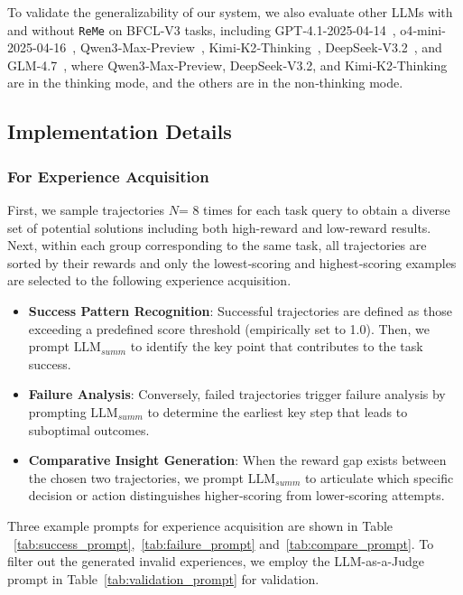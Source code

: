 \documentclass[11pt]{article}
\newcommand{\ours}{\texttt{ReMe}}
\begin{document}
To validate the generalizability of our system, we also evaluate other LLMs with and without {\ours} on BFCL-V3 tasks, including GPT‑4.1-2025-04-14~\cite{gpt-4.1}, o4‑mini-2025-04-16~\cite{o4-mini}, Qwen3‑Max-Preview~\cite{qwen3max}, Kimi‑K2‑Thinking~\cite{kimi-k2-thinking}, DeepSeek‑V3.2~\cite{liu2025deepseek}, and GLM‑4.7~\cite{glm-4.7}, where Qwen3‑Max‑Preview, DeepSeek‑V3.2, and Kimi‑K2‑Thinking are in the thinking mode, and the others are in the non‑thinking mode.

\subsection{Implementation Details}
\subsubsection{For Experience Acquisition}\label{app:settings}
First, we sample trajectories $N$= 8 times for each task query to obtain a diverse set of potential solutions including both high-reward and low-reward results. 
Next, within each group corresponding to the same task, all trajectories are sorted by their rewards and only the lowest‑scoring and highest‑scoring examples are selected to the following experience acquisition. 

\begin{itemize}[leftmargin=12pt,topsep=2pt,itemsep=-2pt]
    \item \textbf{Success Pattern Recognition}: Successful trajectories are defined as those exceeding a predefined score threshold (empirically set to 1.0). Then, we prompt $\text{LLM}_{summ}$ to identify the key point that contributes to the task success. 
    \item \textbf{Failure Analysis}: Conversely, failed trajectories trigger failure analysis by prompting $\text{LLM}_{summ}$ to determine the earliest key step that leads to suboptimal outcomes.
    \item \textbf{Comparative Insight Generation}: When the reward gap exists between the chosen two trajectories, we prompt $\text{LLM}_{summ}$ to articulate which specific decision or action distinguishes higher‑scoring from lower‑scoring attempts. 
\end{itemize}

Three example prompts for experience acquisition are shown in Table ~\ref{tab:success_prompt},~\ref{tab:failure_prompt} and~\ref{tab:compare_prompt}. 
To filter out the generated invalid experiences, we employ the LLM-as-a-Judge prompt in Table~\ref{tab:validation_prompt} for validation. 
\end{document}

